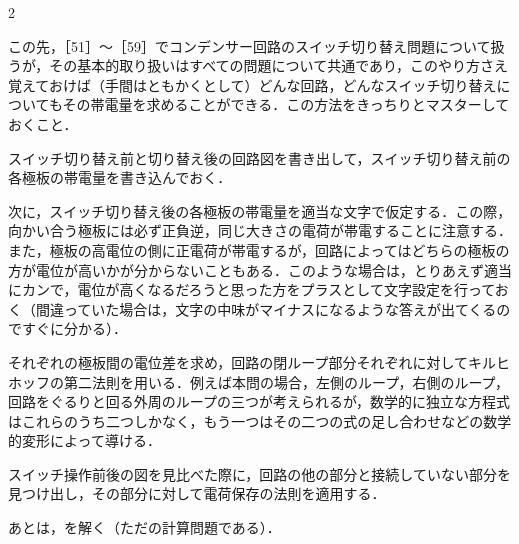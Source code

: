 \begin{multicols}{2}
\par\nopagebreak
\begin{sisin}
この先，［51］〜［59］でコンデンサー回路のスイッチ切り替え問題について扱うが，その基本的取り扱いはすべての問題について共通であり，このやり方さえ覚えておけば（手間はともかくとして）どんな回路，どんなスイッチ切り替えについてもその帯電量を求めることができる．この方法をきっちりとマスターしておくこと．

 スイッチ切り替え前と切り替え後の回路図を書き出して，スイッチ切り替え前の各極板の帯電量を書き込んでおく．

 次に，スイッチ切り替え後の各極板の帯電量を適当な文字で仮定する．この際，向かい合う極板には必ず正負逆，同じ大きさの電荷が帯電することに注意する．また，極板の高電位の側に正電荷が帯電するが，回路によってはどちらの極板の方が電位が高いかが分からないこともある．このような場合は，とりあえず適当にカンで，電位が高くなるだろうと思った方をプラスとして文字設定を行っておく（間違っていた場合は，文字の中味がマイナスになるような答えが出てくるのですぐに分かる）．

 それぞれの極板間の電位差を求め，回路の閉ループ部分それぞれに対してキルヒホッフの第二法則を用いる．例えば本問の場合，左側のループ，右側のループ，回路をぐるりと回る外周のループの三つが考えられるが，数学的に独立な方程式はこれらのうち二つしかなく，もう一つはその二つの式の足し合わせなどの数学的変形によって導ける．

 スイッチ操作前後の図を見比べた際に，回路の他の部分と接続していない部分を見つけ出し，その部分に対して電荷保存の法則を適用する．

 あとは，を解く（ただの計算問題である）．


\end{sisin}
\end{multicols}
